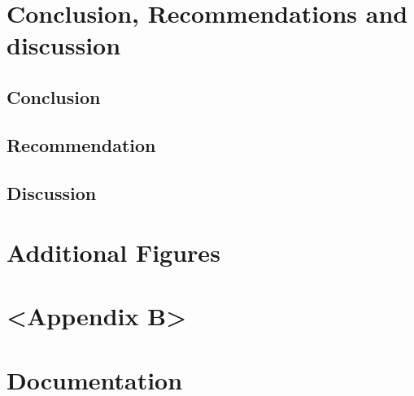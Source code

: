 \documentclass[12pt]{scrreprt}
\begin{document}
%

\chapter{Conclusion, Recommendations and discussion}
\section{Conclusion}
\section{Recommendation}



\section{Discussion}

\begin{appendices}
\chapter{Additional Figures}
\chapter{<Appendix B>}
\chapter{Documentation}
\end{appendices}
\end{document}
